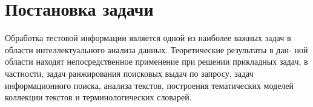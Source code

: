 \newpage{}
\chapter*{Постановка задачи}
Обработка тестовой информации является одной из наиболее важных задач
в области интеллектуального анализа данных. Теоретические результаты в дан-
ной области находят непосредственное применение при решении прикладных
задач, в частности, задач ранжирования поисковых выдач по запросу, задач
информационного поиска, анализа текстов, построения тематических моделей
коллекции текстов и терминологических словарей.

